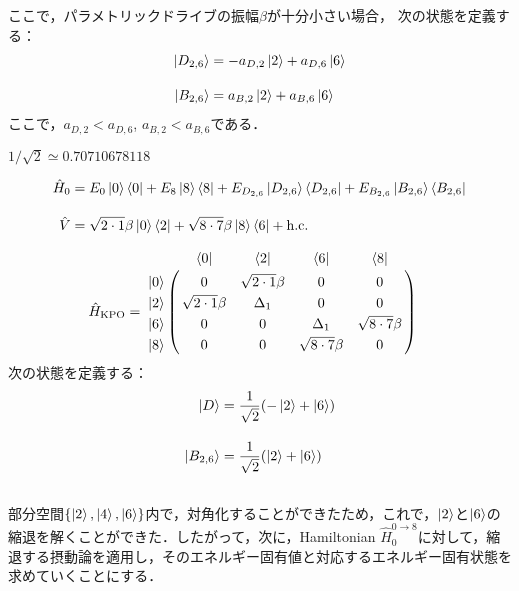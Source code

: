 ここで，パラメトリックドライブの振幅$\beta$が十分小さい場合，
次の状態を定義する：
\begin{align}
    \ket{D_{2,6}} &= -a_{D,2}\ket{2}+a_{D,6}\ket{6}\\[10pt]
    \ket{B_{2,6}} &= a_{B,2}\ket{2}+a_{B,6}\ket{6}
\end{align}
ここで，$a_{D,2} < a_{D,6}$, $a_{B,2} < a_{B,6}$である．

$1/\sqrt{2} \simeq 0.70710678118$

\begin{align}
    \hat{H}_0 &= E_{0}\ket{0}\bra{0} + E_8 \ket{8}\bra{8} + E_{D_{2,6}} \ket{D_{2,6}}\bra{D_{2,6}}+ E_{B_{2,6}} \ket{B_{2,6}}\bra{B_{2,6}}\\[10pt]
    \hat{V}&= \sqrt{2\cdot1}\beta\ket{0}\bra{2} + \sqrt{8\cdot7}\beta\ket{8}\bra{6} + {\rm{h.c.}}
\end{align}


\begin{align}
     \hat{H}_{\rm{KPO}}
    &=
   \bordermatrix{     
    & \bra{0} &  \bra{2} &  \bra{6}&  \bra{8}\cr
   \ket{0}&0&\sqrt{2\cdot1}\beta&0&0\cr
  \ket{2}&\sqrt{2\cdot1}\beta&\Delta_1&0&0\cr
  \ket{6}&0&0&\Delta_1&\sqrt{8\cdot7}\beta\cr
  \ket{8}&0&0&\sqrt{8\cdot7}\beta&0\cr
            }
\end{align}
次の状態を定義する：
\begin{align}
    \ket{D} &= \frac{1}{\sqrt{2}}(-\ket{2}+\ket{6})\\[10pt]
    \ket{B_{2,6}} &= \frac{1}{\sqrt{2}}(\ket{2}+\ket{6})
\end{align}







\subsection{}
部分空間$\{\ket{2}, \ket{4}, \ket{6}\}$内で，対角化することができたため，これで，$\ket{2}$と$\ket{6}$の縮退を解くことができた．したがって，次に，Hamiltonian $\hat{H}_0^{0\to8}$に対して，縮退する摂動論を適用し，そのエネルギー固有値と対応するエネルギー固有状態を求めていくことにする．


